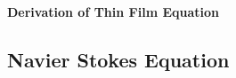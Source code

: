 \documentclass[11pt, oneside]{article}
\begin{document}
\begin{center}
\textbf{\Large{Derivation of Thin Film Equation
}}
\end{center}

\subsection{Navier Stokes Equation}
\end{document}
